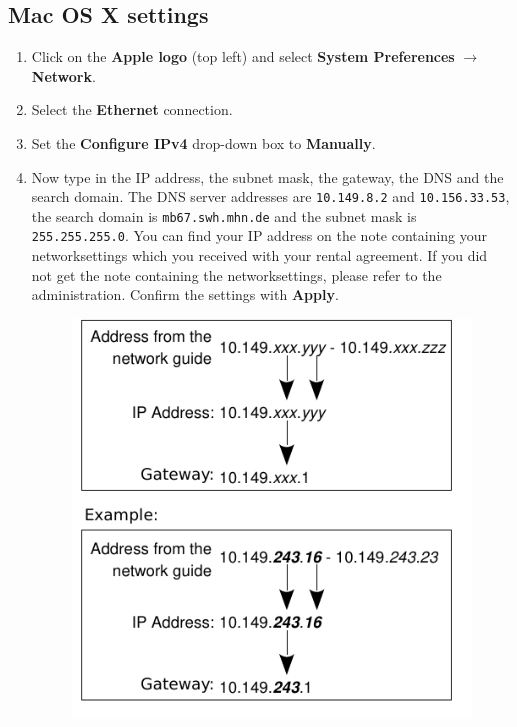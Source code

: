 \documentclass[a4paper,12pt]{scrartcl}
\newcommand{\optemph}[1]{\textbf{#1}}
\begin{document}
\subsection*{Mac OS X settings}
\begin{enumerate}
	\item Click on the \optemph{Apple logo} (top left) and select \optemph{System Preferences} $\rightarrow$ \optemph{Network}.
	\item Select the \optemph{Ethernet} connection.
	\item Set the \optemph{Configure IPv4} drop-down box to \optemph{Manually}.
	\item Now type in the IP address, the subnet mask, the gateway, the DNS and the search domain. The DNS server addresses are \nolinkurl{10.149.8.2} and \nolinkurl{10.156.33.53}, the search domain is \nolinkurl{mb67.swh.mhn.de} and the subnet mask is \nolinkurl{255.255.255.0}. You can find your IP address on the note containing your networksettings which you received with your rental agreement. If you did not get the note containing the networksettings, please refer to the administration. Confirm the settings with \optemph{Apply}.
      \begin{figure}[h!]
      \centering
        \begin{minipage}[c]{0.38\linewidth}
          \centering
          \includegraphics[width=\linewidth,keepaspectratio]{Bilder/IP_Gerneric_EN}

\end{minipage}
\end{figure}
\end{enumerate}
\end{document}
